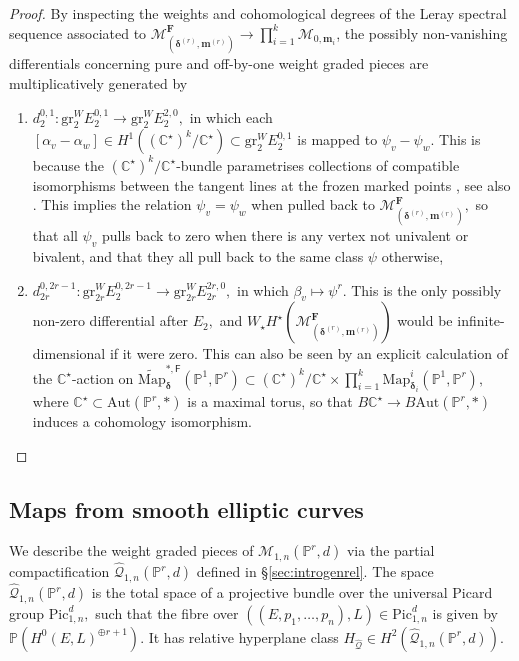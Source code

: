 \documentclass[12pt,reqno]{amsart}
\theoremstyle{definition}
\theoremstyle{definition}
\theoremstyle{definition}
\theoremstyle{definition}
\newcommand{\PP}{\mathbb{P}}
\begin{document}
\begin{proof}
  By inspecting the weights and cohomological degrees of the Leray spectral sequence associated to $\mathcal{M}^{\mathbf{F}}_{(\boldsymbol{\delta}^{(r)}, \boldsymbol{m}^{(r)})}\to \prod_{i=1}^k \mathcal{M}_{0, \boldsymbol{m}_i}$, the possibly non-vanishing differentials concerning pure and off-by-one weight graded pieces are multiplicatively generated by \begin{enumerate}
  \item $d_2^{0,1}: \mathrm{gr}^W_2 E_{2}^{0,1}\to \mathrm{gr}^W_2 E_2^{2,0},$ in which each $[\alpha_v-\alpha_w]\in H^1((\mathbb{C}^\star)^k/\mathbb{C}^\star)\subset \mathrm{gr}^W_2 E_{2}^{0,1}$ is mapped to $\psi_v-\psi_w.$ This is because the $(\mathbb{C}^\star)^k/\mathbb{C}^\star$-bundle parametrises collections of compatible isomorphisms between the tangent lines at the frozen marked points \cite[§2]{bnr}, see also \cite[Lemma 3.2]{vzdualcomplex}. This implies the relation $\psi_v=\psi_w$ when pulled back to $\mathcal{M}^{\mathbf{F}}_{(\boldsymbol{\delta}^{(r)}, \boldsymbol{m}^{(r)})},$ so that all $\psi_v$ pulls back to zero when there is any vertex not univalent or bivalent, and that they all pull back to the same class $\psi$ otherwise,
  \item $d_{2r}^{0,2r-1}: \mathrm{gr}^W_{2r} E_{2}^{0,2r-1}\to \mathrm{gr}^W_{2r} E_{2r}^{2r,0},$ in which $\beta_v\mapsto \psi^r.$ This is the only possibly non-zero differential after $E_2,$ and $W_{\star}H^\star(\mathcal{M}_{(\boldsymbol{\delta}^{(r)}, \boldsymbol{m}^{(r)})}^{\boldsymbol{F}})$ would be infinite-dimensional if it were zero. This can also be seen by an explicit calculation of the $\mathbb{C}^\star$-action on $\widetilde{\mathrm{Map}}_{\boldsymbol{\delta}}^{*,\mathsf{F}}(\PP^1,\PP^r)\subset (\mathbb{C}^{\star})^k/\mathbb{C}^{\star}\times \prod_{i=1}^{k}\mathrm{Map}_{\boldsymbol{\delta}_i}^i(\PP^1,\PP^r),$ where $\mathbb{C}^\star\subset \mathrm{Aut}(\PP^r,*)$ is a maximal torus, so that $B\mathbb{C}^\star\to B\mathrm{Aut}(\PP^r,*)$ induces a cohomology isomorphism.
  \end{enumerate}
\end{proof}

\subsection{Maps from smooth elliptic curves}\label{sec:mapellip}
We describe the weight graded pieces of $\mathcal{M}_{1,n}(\PP^r,d)$ via the partial compactification $\hat{\mathcal{Q}}_{1,n}(\PP^r,d)$ defined in §\ref{sec:introgenrel}. The space $\hat{\mathcal{Q}}_{1,n}(\PP^r,d)$ is the total space of a projective bundle over the universal Picard group $\mathrm{Pic}^d_{1,n},$ such that the fibre over $((E, p_1,\dots,p_n),L)\in \mathrm{Pic}^d_{1,n}$ is given by $\mathbb{P}(H^0(E, L)^{\oplus r+1}).$ It has relative hyperplane class $H_{\hat{\mathcal{Q}}}\in H^2(\hat{\mathcal{Q}}_{1,n}(\PP^r,d)).$
\end{document}
